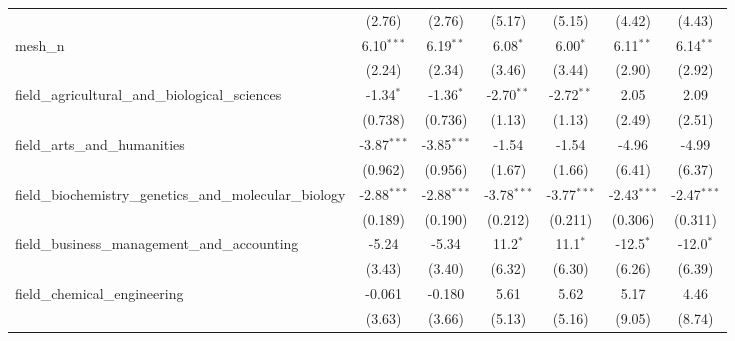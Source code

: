 \begin{tabular}{lcccccc}
                                                               & (2.76)         & (2.76)         & (5.17)        & (5.15)        & (4.42)         & (4.43)\\   
   mesh\_n                                                     & 6.10$^{***}$   & 6.19$^{**}$    & 6.08$^{*}$    & 6.00$^{*}$    & 6.11$^{**}$    & 6.14$^{**}$\\   
                                                               & (2.24)         & (2.34)         & (3.46)        & (3.44)        & (2.90)         & (2.92)\\   
   field\_agricultural\_and\_biological\_sciences              & -1.34$^{*}$    & -1.36$^{*}$    & -2.70$^{**}$  & -2.72$^{**}$  & 2.05           & 2.09\\   
                                                               & (0.738)        & (0.736)        & (1.13)        & (1.13)        & (2.49)         & (2.51)\\   
   field\_arts\_and\_humanities                                & -3.87$^{***}$  & -3.85$^{***}$  & -1.54         & -1.54         & -4.96          & -4.99\\   
                                                               & (0.962)        & (0.956)        & (1.67)        & (1.66)        & (6.41)         & (6.37)\\   
   field\_biochemistry\_genetics\_and\_molecular\_biology      & -2.88$^{***}$  & -2.88$^{***}$  & -3.78$^{***}$ & -3.77$^{***}$ & -2.43$^{***}$  & -2.47$^{***}$\\   
                                                               & (0.189)        & (0.190)        & (0.212)       & (0.211)       & (0.306)        & (0.311)\\   
   field\_business\_management\_and\_accounting                & -5.24          & -5.34          & 11.2$^{*}$    & 11.1$^{*}$    & -12.5$^{*}$    & -12.0$^{*}$\\   
                                                               & (3.43)         & (3.40)         & (6.32)        & (6.30)        & (6.26)         & (6.39)\\   
   field\_chemical\_engineering                                & -0.061         & -0.180         & 5.61          & 5.62          & 5.17           & 4.46\\   
                                                               & (3.63)         & (3.66)         & (5.13)        & (5.16)        & (9.05)         & (8.74)\\   

\end{tabular}
